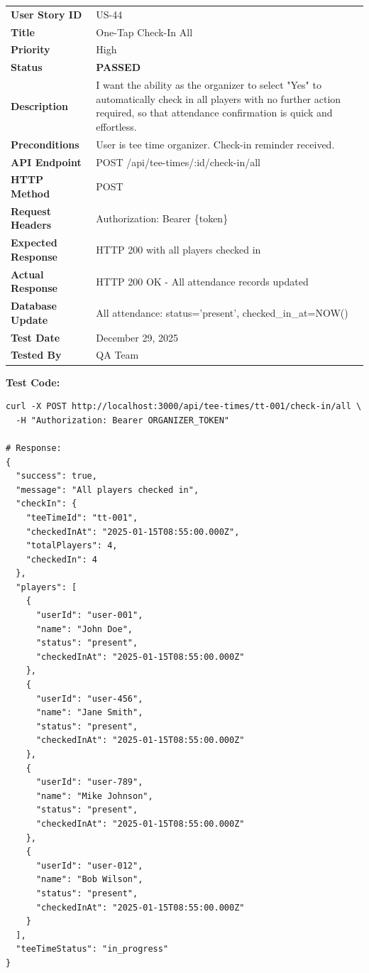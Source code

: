 \documentclass[11pt,a4paper]{article}
\newcommand{\passed}{\textcolor{pass}{\textbf{PASSED}}}
\begin{document}
\begin{tabularx}{\textwidth}{|p{3.2cm}|Y|}
\hline
{}
 \\
\hline
\textbf{User Story ID} & US-44 \\
\hline
\textbf{Title} & One-Tap Check-In All \\
\hline
\textbf{Priority} & High \\
\hline
\textbf{Status} & \passed \\
\hline
\textbf{Description} & I want the ability as the organizer to select "Yes" to automatically check in all players with no further action required, so that attendance confirmation is quick and effortless. \\
\hline
\textbf{Preconditions} & User is tee time organizer. Check-in reminder received. \\
\hline
\textbf{API Endpoint} & POST /api/tee-times/:id/check-in/all \\
\hline
\textbf{HTTP Method} & POST \\
\hline
\textbf{Request Headers} & Authorization: Bearer \{token\} \\
\hline
\textbf{Expected Response} & HTTP 200 with all players checked in \\
\hline
\textbf{Actual Response} & HTTP 200 OK - All attendance records updated \\
\hline
\textbf{Database Update} & All attendance: status='present', checked\_in\_at=NOW() \\
\hline
\textbf{Test Date} & December 29, 2025 \\
\hline
\textbf{Tested By} & QA Team \\
\hline
\end{tabularx}

\vspace{0.3cm}
\textbf{Test Code:}
\begin{lstlisting}
curl -X POST http://localhost:3000/api/tee-times/tt-001/check-in/all \
  -H "Authorization: Bearer ORGANIZER_TOKEN"

# Response:
{
  "success": true,
  "message": "All players checked in",
  "checkIn": {
    "teeTimeId": "tt-001",
    "checkedInAt": "2025-01-15T08:55:00.000Z",
    "totalPlayers": 4,
    "checkedIn": 4
  },
  "players": [
    {
      "userId": "user-001",
      "name": "John Doe",
      "status": "present",
      "checkedInAt": "2025-01-15T08:55:00.000Z"
    },
    {
      "userId": "user-456",
      "name": "Jane Smith",
      "status": "present",
      "checkedInAt": "2025-01-15T08:55:00.000Z"
    },
    {
      "userId": "user-789",
      "name": "Mike Johnson",
      "status": "present",
      "checkedInAt": "2025-01-15T08:55:00.000Z"
    },
    {
      "userId": "user-012",
      "name": "Bob Wilson",
      "status": "present",
      "checkedInAt": "2025-01-15T08:55:00.000Z"
    }
  ],
  "teeTimeStatus": "in_progress"
}
\end{lstlisting}
\end{document}
